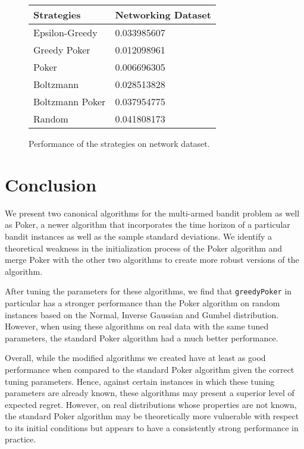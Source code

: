 \documentclass[12pt]{article}
\begin{document}
\begin{figure}
\begin{center}
    \begin{tabular}{| l | l |}
    \hline
    Strategies & Networking Dataset \\ \hline
    Epsilon-Greedy & 0.033985607\\ \hline
    Greedy Poker & 0.012098961 \\ \hline
    Poker & 0.006696305 \\ \hline
    Boltzmann & 0.028513828 \\ \hline
    Boltzmann Poker & 0.037954775 \\ \hline 
    Random & 0.041808173 \\ \hline
    \hline
    \end{tabular}
\end{center}  
\caption{Performance of the strategies on network dataset.}
\end{figure}

\section{Conclusion}

We present two canonical algorithms for the multi-armed bandit problem as well as Poker, a newer algorithm that incorporates the time horizon of a particular bandit instances as well as the sample standard deviations. We identify a theoretical weakness in the initialization process of the Poker algorithm and merge Poker with the other two algorithms to create more robust versions of the algorithm.

After tuning the parameters for these algorithms, we find that \texttt{greedyPoker} in particular has a stronger performance than the Poker algorithm on random instances based on the Normal, Inverse Gaussian and Gumbel distribution. However, when using these algorithms on real data with the same tuned parameters, the standard Poker algorithm had a much better performance.

Overall, while the modified algorithms we created have at least as good performance when compared to the standard Poker algorithm given the correct tuning parameters. Hence, against certain instances in which these tuning parameters are already known, these algorithms may present a superior level of expected regret. However, on real distributions whose properties are not known, the standard Poker algorithm may be theoretically more vulnerable with respect to its initial conditions but appears to have a consistently strong performance in practice.



\end{document}
